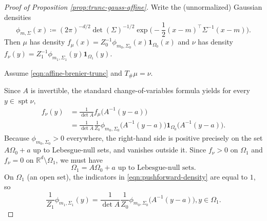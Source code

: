 \documentclass{article}
\theoremstyle{plain}
\theoremstyle{definition}
\theoremstyle{remark}
\numberwithin{equation}{section}
\DeclareMathOperator{\spt}{spt}
\newcommand{\R}{\mathbb{R}}
\begin{document}
\begin{proof}[Proof of Proposition \ref{prop:trunc-gauss-affine}]
Write the (unnormalized) Gaussian densities
$$
\phi_{m,\Sigma}(x)\coloneqq(2\pi)^{-d/2}\det(\Sigma)^{-1/2}\exp\Big(-\frac12(x-m)^\top\Sigma^{-1}(x-m)\Big).
$$
Then $\mu$ has density $f_\mu(x)=Z_0^{-1}\phi_{m_0,\Sigma_0}(x)\mathbf1_{\Omega_0}(x)$ and $\nu$ has density $f_\nu(y)=Z_1^{-1}\phi_{m_1,\Sigma_1}(y)\mathbf1_{\Omega_1}(y)$.

Assume \eqref{eqn:affine-brenier-trunc} and $T_\#\mu=\nu$.

























Since $A$ is invertible, the standard change-of-variables formula yields for every $y\in\spt\nu$,
\begin{equation}\label{eqn:pushforward-density}
\begin{aligned}
f_\nu(y)&=\frac{1}{\det A}f_\mu\big(A^{-1}(y-a)\big)\\
&=\frac{1}{\det A}\frac{1}{Z_0}\phi_{m_0,\Sigma_0}\big(A^{-1}(y-a)\big)\mathbf1_{\Omega_0}\big(A^{-1}(y-a)\big).
\end{aligned}
\end{equation}
Because $\phi_{m_0,\Sigma_0}>0$ everywhere, the right-hand side is positive precisely on the set $A\Omega_0+a$ up to Lebesgue-null sets, and vanishes outside it. 
Since $f_\nu>0$ on $\Omega_1$ and $f_\nu=0$ on $\R^d\setminus\Omega_1$, we must have
\[
\Omega_1=A\Omega_0+a\text{ up to Lebesgue-null sets.}
\]
On $\Omega_1$ (an open set), the indicators in \eqref{eqn:pushforward-density} are equal to $1$, so
\begin{equation}\label{eqn:density-equality-on-open}
\frac{1}{Z_1}\phi_{m_1,\Sigma_1}(y)=\frac{1}{\det A}\frac{1}{Z_0}\phi_{m_0,\Sigma_0}\big(A^{-1}(y-a)\big),y\in\Omega_1.
\end{equation}


\end{proof}
\end{document}
